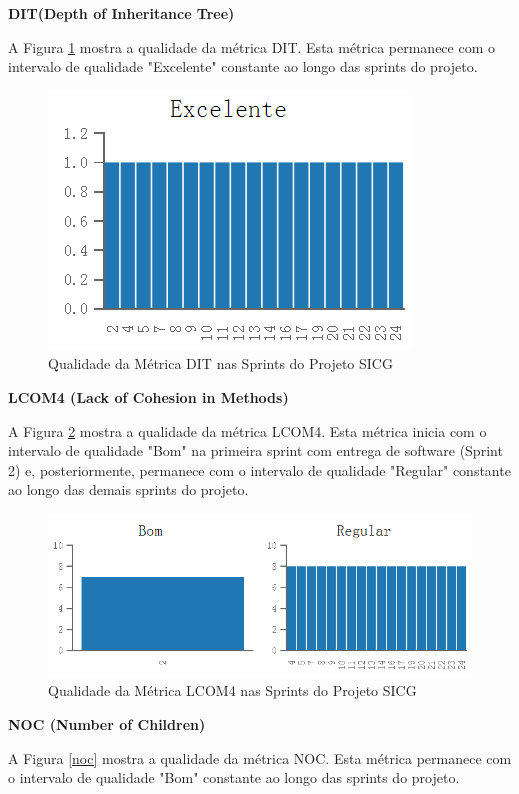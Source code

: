 \textbf{DIT(Depth of Inheritance Tree)}

A Figura \ref{dit} mostra a qualidade da métrica DIT. Esta métrica permanece com o intervalo de qualidade "Excelente" constante ao longo das sprints do projeto.

\begin{figure}[H]
		\centering
			\includegraphics[scale=1.0]{figuras/dit.png}
		\caption{Qualidade da Métrica DIT nas Sprints do Projeto SICG}
		\label{dit}
\end{figure}


\textbf{LCOM4 (Lack of Cohesion in Methods)} 

A Figura \ref{lcom4} mostra a qualidade da métrica LCOM4. Esta métrica inicia com o intervalo de qualidade "Bom" na primeira sprint com entrega de software (Sprint 2) e, posteriormente, permanece com o intervalo de qualidade "Regular" constante ao longo das demais sprints do projeto.

\begin{figure}[H]
		\centering
			\includegraphics[scale=0.9]{figuras/lcom4.png}
		\caption{Qualidade da Métrica LCOM4  nas Sprints do Projeto SICG}
		\label{lcom4}
\end{figure}

\textbf{NOC (Number of Children)}

A Figura \ref{noc} mostra a qualidade da métrica NOC. Esta métrica permanece com o intervalo de qualidade "Bom" constante ao longo das sprints do projeto.

